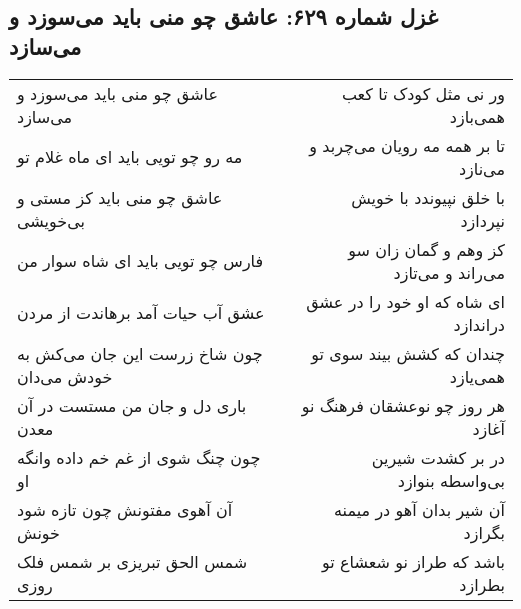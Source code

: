 \begin{center}
\section*{غزل شماره ۶۲۹: عاشق چو منی باید می‌سوزد و می‌سازد}
\label{sec:0629}
\begin{longtable}{l p{0.5cm} r}
عاشق چو منی باید می‌سوزد و می‌سازد
&&
ور نی مثل کودک تا کعب همی‌بازد
\\
مه رو چو تویی باید ای ماه غلام تو
&&
تا بر همه مه رویان می‌چربد و می‌نازد
\\
عاشق چو منی باید کز مستی و بی‌خویشی
&&
با خلق نپیوندد با خویش نپردازد
\\
فارس چو تویی باید ای شاه سوار من
&&
کز وهم و گمان زان سو می‌راند و می‌تازد
\\
عشق آب حیات آمد برهاندت از مردن
&&
ای شاه که او خود را در عشق دراندازد
\\
چون شاخ زرست این جان می‌کش به خودش می‌دان
&&
چندان که کشش بیند سوی تو همی‌یازد
\\
باری دل و جان من مستست در آن معدن
&&
هر روز چو نوعشقان فرهنگ نو آغازد
\\
چون چنگ شوی از غم خم داده وانگه او
&&
در بر کشدت شیرین بی‌واسطه بنوازد
\\
آن آهوی مفتونش چون تازه شود خونش
&&
آن شیر بدان آهو در میمنه بگرازد
\\
شمس الحق تبریزی بر شمس فلک روزی
&&
باشد که طراز نو شعشاع تو بطرازد
\\
\end{longtable}
\end{center}
